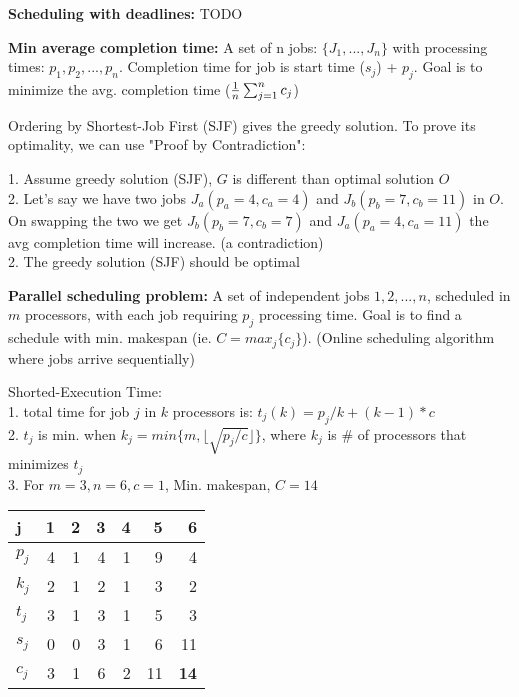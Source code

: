 \textbf{Scheduling with deadlines:} TODO

\textbf{Min average completion time:} A set of n jobs: $\{J_1,...,J_n\}$ with processing times: $p_1,p_2,...,p_n$. Completion time for job is start time ($s_j$) + $p_j$. Goal is to minimize the avg. completion time (${1 \over n} \sum_{j=1}^{n} c_j$) 

Ordering by Shortest-Job First (SJF) gives the greedy solution. To prove its optimality, we can use "Proof by Contradiction":

1. Assume greedy solution (SJF), $G$ is different than optimal solution $O$\\
2. Let's say we have two jobs $J_a (p_a = 4, c_a = 4)$ and $J_b (p_b = 7, c_b = 11)$ in $O$. On swapping the two we get $J_b (p_b = 7, c_b = 7)$ and $J_a (p_a = 4, c_a = 11)$ the avg completion time will increase. (a contradiction)\\
2. The greedy solution (SJF) should be optimal

\textbf{Parallel scheduling problem:} A set of independent jobs $1,2,...,n$, scheduled in $m$ processors, with each job requiring $p_j$ processing time. Goal is to find a schedule with min. makespan (ie. $C = max_j\{c_j\}$). (Online scheduling algorithm where jobs arrive sequentially)

Shorted-Execution Time:\\
1. total time for job $j$ in $k$ processors is: $t_j(k) = p_j/k + (k-1)*c $\\
2. $t_j$ is min. when $k_j = min\{m, \lfloor \sqrt{p_j / c} \rfloor\}$, where $k_j$ is \# of processors that minimizes $t_j$\\ 
3. For $m=3, n=6, c=1$, Min. makespan, $C = 14$
\begin{center}
    \begin{tabular}{ |l|r|r|r|r|r|r| } 
        \hline
        j & 1 & 2 & 3 & 4 & 5 & 6 \\
        \hline
        $p_j$ & 4 & 1 & 4 & 1 & 9 & 4 \\
        $k_j$ & 2 & 1 & 2 & 1 & 3 & 2 \\
        $t_j$ & 3 & 1 & 3 & 1 & 5 & 3 \\
        $s_j$ & 0 & 0 & 3 & 1 & 6 & 11 \\
        $c_j$ & 3 & 1 & 6 & 2 & 11 & \textbf{14} \\
    \end{tabular}
\end{center}
